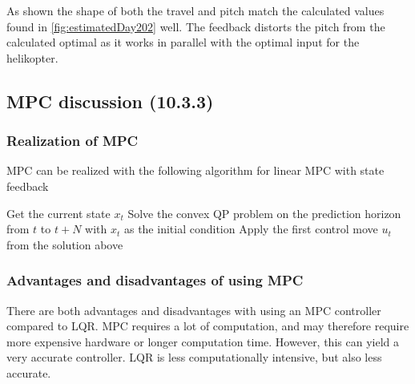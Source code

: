 As shown the shape of both the travel and pitch match the calculated values found in \ref{fig:estimatedDay202} well. The feedback distorts the pitch from the calculated optimal as it works in parallel with the optimal input for the helikopter.

\subsection{MPC discussion (10.3.3)}

\subsubsection{Realization of MPC}
MPC can be realized with the following algorithm for linear MPC with state feedback

\begin{algorithmic}
\State Get the current state $x_t$
\State Solve the convex QP problem on the prediction horizon from $t$ to $t+N$ with $x_t$ as the initial condition
\State Apply the first control move $u_t$ from the solution above
\EndFor
\end{algorithmic}

\subsubsection{Advantages and disadvantages of using MPC}
There are both advantages and disadvantages with using an MPC controller compared to LQR.   
MPC requires a lot of computation, and may therefore require more expensive hardware or longer computation time. However, this can yield a very accurate controller. LQR is less computationally intensive, but also less accurate.

